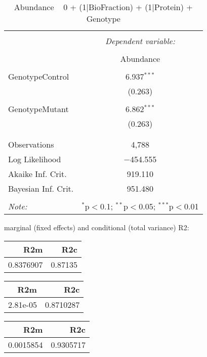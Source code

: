 \documentclass[11pt]{report}
\begin{document}
\begin{table}[!htbp] \centering 
  \caption{Abundance ~ 0 + (1|BioFraction) + (1|Protein) + Genotype} 
  \label{} 
\begin{tabular}{@{\extracolsep{5pt}}lc} 
\\[-1.8ex]\hline 
\hline \\[-1.8ex] 
 & \multicolumn{1}{c}{\textit{Dependent variable:}} \\ 
\cline{2-2} 
\\[-1.8ex] & Abundance \\ 
\hline \\[-1.8ex] 
 GenotypeControl & 6.937$^{***}$ \\ 
  & (0.263) \\ 
  & \\ 
 GenotypeMutant & 6.862$^{***}$ \\ 
  & (0.263) \\ 
  & \\ 
\hline \\[-1.8ex] 
Observations & 4,788 \\ 
Log Likelihood & $-$454.555 \\ 
Akaike Inf. Crit. & 919.110 \\ 
Bayesian Inf. Crit. & 951.480 \\ 
\hline 
\hline \\[-1.8ex] 
\textit{Note:}  & \multicolumn{1}{r}{$^{*}$p$<$0.1; $^{**}$p$<$0.05; $^{***}$p$<$0.01} \\ 
\end{tabular} 
\end{table} 
marginal (fixed effects) and conditional (total variance) R2:

\begin{tabular}{r|r}
\hline
R2m & R2c\\
\hline
0.8376907 & 0.87135\\
\hline
\end{tabular}

\begin{tabular}{r|r}
\hline
R2m & R2c\\
\hline
2.81e-05 & 0.8710287\\
\hline
\end{tabular}

\begin{tabular}{r|r}
\hline
R2m & R2c\\
\hline
0.0015854 & 0.9305717\\
\hline
\end{tabular}
\end{document}
